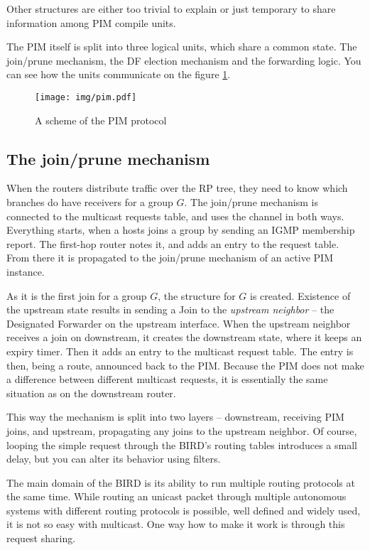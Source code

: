 \noindent Other structures are either too trivial to explain or just temporary
to share information among PIM compile units.

The PIM itself is split into three logical units, which share a common state.
The join/prune mechanism, the DF election mechanism and the forwarding logic.
You can see how the units communicate on the figure \ref{pim-units}.

\begin{figure}[htp]
\centering
\texttt{[image: img/pim.pdf]}
\caption{A scheme of the PIM protocol}
\label{pim-units}
\end{figure}

\subsection{The join/prune mechanism}
When the routers distribute traffic over the RP tree, they need to know which
branches do have receivers for a group $G$. The join/prune mechanism is connected to
the multicast requests table, and uses the channel in both ways. Everything
starts, when a hosts joins a group by sending an IGMP membership report. The
first-hop router notes it, and adds an entry to the request table. From there it is
propagated to the join/prune mechanism of an active PIM instance.

As it is the first join for a group $G$, the  structure for $G$ is
created. Existence of the upstream state results in sending a Join to the
\emph{upstream neighbor} -- the Designated Forwarder on the upstream interface.
When the upstream neighbor receives a join on downstream, it creates the
downstream state, where it keeps an expiry timer. Then it adds an entry to the
multicast request table. The entry is then, being a route, announced back to
the PIM. Because the PIM does not make a difference between different multicast
requests, it is essentially the same situation as on the downstream router.

\label{why-pim-mreq}
This way the mechanism is split into two layers -- downstream, receiving PIM
joins, and upstream, propagating any joins to the upstream neighbor. Of course,
looping the simple request through the BIRD's routing tables introduces a small
delay, but you can alter its behavior using filters.

The main domain of the BIRD is its ability to run multiple routing protocols at
the same time. While routing an unicast packet through multiple autonomous
systems with different routing protocols is possible, well defined and widely
used, it is not so easy with multicast. One way how to make it work is through
this request sharing.

